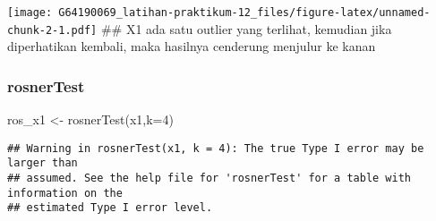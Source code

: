 \documentclass[
]{article}
\newenvironment{Shaded}{\begin{snugshade}}{\end{snugshade}}
\newcommand{\AttributeTok}[1]{\textcolor[rgb]{0.77,0.63,0.00}{#1}}
\newcommand{\DecValTok}[1]{\textcolor[rgb]{0.00,0.00,0.81}{#1}}
\newcommand{\FunctionTok}[1]{\textcolor[rgb]{0.00,0.00,0.00}{#1}}
\newcommand{\NormalTok}[1]{#1}
\newcommand{\OtherTok}[1]{\textcolor[rgb]{0.56,0.35,0.01}{#1}}
\newcommand{\SpecialCharTok}[1]{\textcolor[rgb]{0.00,0.00,0.00}{#1}}
\newcommand{\StringTok}[1]{\textcolor[rgb]{0.31,0.60,0.02}{#1}}
\begin{document}
\begin{Shaded}
\end{Shaded}

\texttt{[image: G64190069\_latihan-praktikum-12\_files/figure-latex/unnamed-chunk-2-1.pdf]}
\#\# X1 ada satu outlier yang terlihat, kemudian jika diperhatikan
kembali, maka hasilnya cenderung menjulur ke kanan

\hypertarget{rosnertest}{%
\subsubsection{rosnerTest}\label{rosnertest}}

\begin{Shaded}
\begin{Highlighting}[]
\NormalTok{ros\_x1 }\OtherTok{\textless{}{-}} \FunctionTok{rosnerTest}\NormalTok{(x1,}\AttributeTok{k=}\DecValTok{4}\NormalTok{)}
\end{Highlighting}
\end{Shaded}

\begin{verbatim}
## Warning in rosnerTest(x1, k = 4): The true Type I error may be larger than
## assumed. See the help file for 'rosnerTest' for a table with information on the
## estimated Type I error level.
\end{verbatim}
\end{document}
